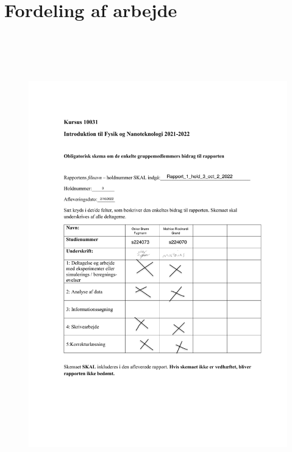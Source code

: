 \documentclass[a4paper,twoside]{article}
\begin{document}
\section{Fordeling af arbejde}
\begin{figure}[H]
\begin{centering}
\includegraphics[height=20cm]{Bidragsskema_2022}
\hspace{0cm}
\par\end{centering}
\end{figure}
\end{document}
